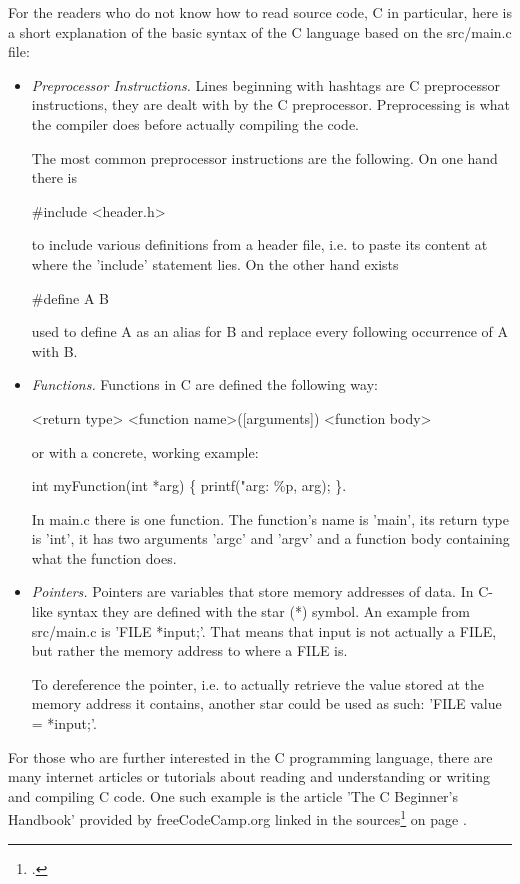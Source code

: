 \documentclass[12pt,a4paper,man]{apa7}
\newcommand{\expr}[1] {
    \begin{center}
        #1
    \end{center}
}
\begin{document}
For the readers who do not know how to read source code, C in particular, here is a short
explanation of the basic syntax of the C language based on the src/main.c file:
\begin{itemize}
    \item \emph{Preprocessor Instructions.} Lines beginning with hashtags are
        C preprocessor instructions, they are dealt with by the C preprocessor.
        Preprocessing is what the compiler does before actually compiling the
        code.

        The most common preprocessor instructions are the following.
        On one hand there is \expr{\#include <header.h>}
        to include various definitions from a header file, i.e. to paste
        its content at where the 'include' statement lies.
        On the other hand exists \expr{\#define A B} used to
        define A as an alias for B and replace every following occurrence of A
        with B.

    \item \emph{Functions.} Functions in C are defined the following way:
        \expr{<return type> <function name>([arguments]) { <function body> }}
        or with a concrete, working example:
        \expr{int myFunction(int *arg) \{ printf("arg: \%p, arg); \}.}
        In main.c there is one function. The function's name is 'main', its
        return type is 'int', it has two arguments 'argc' and 'argv' and a
        function body containing what the function does.

    \item \emph{Pointers.} Pointers are variables that store memory addresses
        of data. In C-like syntax they are defined with the star (*) symbol.
        An example from src/main.c is 'FILE *input;'. That means that input is not
        actually a FILE, but rather the memory address to where a FILE is.

        To dereference the pointer, i.e. to actually retrieve the value stored
        at the memory address it contains, another star could be used as such:
        'FILE value = *input;'.
\end{itemize}

For those who are further interested in the C programming language, there are
many internet articles or tutorials about reading and understanding or
writing and compiling C code. One such example is the article 'The C Beginner's
Handbook' provided by freeCodeCamp.org linked in the sources\footcite{freeCodeCamp}
on page \pageref{bibliography}.
\end{document}
